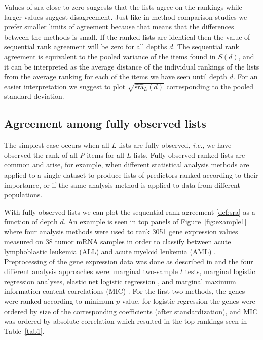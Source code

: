 \documentclass[12pt,a4paper]{article}
\makeatletter
\newcommand{\ie}{\emph{i.e.}\@\xspace}
\theoremstyle{plain}
\makeatother
\begin{document}
Values of \textrm{sra} close to zero suggests that the lists agree on
the rankings while larger values suggest disagreement.  Just like in
method comparison studies we prefer smaller limits of agreement
because that means that the differences between the methods is
small. If the ranked lists are identical then the value of sequential
rank agreement will be zero for all depths $d$.  The sequential rank
agreement is equivalent to the pooled variance of the items found in
$S(d)$, and it can be interpreted as the average distance of the
individual rankings of the lists from the average ranking for each of
the items we have seen until depth $d$.  For an easier interpretation
we suggest to plot $\sqrt{\widehat{\textrm{sra}}_L(d)}$ corresponding
to the pooled standard deviation.



\subsection{Agreement among fully observed lists}
\label{sec:amfol}

The simplest case occurs when all $L$ lists are fully observed, \ie,
we have observed the rank of all $P$ items for all $L$ lists. Fully
observed ranked lists are common and arise, for example, when
different statistical analysis methods are applied to a single dataset
to produce lists of predictors ranked according to their importance,
or if the same analysis method is applied to data from different
populations.

With fully observed lists we can plot the sequential rank agreement
\ref{def:sra} as a function of depth $d$. An example is seen in top
panels of Figure~\ref{fig:example1} where four analysis methods were
used to rank 3051 gene expression values measured on 38 tumor mRNA
samples in order to classify between acute lymphoblastic leukemia
(ALL) and acute myeloid leukemia (AML)
\citep{Golub1999}. Preprocessing of the gene expression data was done
as described in \citet{Dudoit2002} and the four different analysis
approaches were: marginal two-sample $t$ tests, marginal logistic
regression analyses, elastic net logistic regression
\citep{friedman2010regularization}, and marginal maximum information
content correlations (MIC) \citep{Reshef2011}. For the first two
methods, the genes were ranked according to minimum $p$ value, for
logistic regression the genes were ordered by size of the
corresponding coefficients (after standardization), and MIC was
ordered by absolute correlation which resulted in the top rankings
seen in Table~\ref{tab1}.
\end{document}

